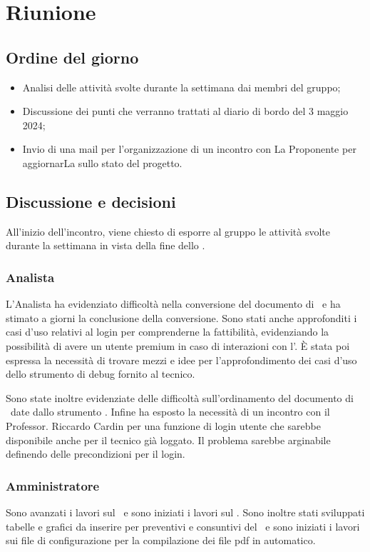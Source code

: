 \section{Riunione}
\subsection{Ordine del giorno}
\begin{itemize}
	\item Analisi delle attività svolte durante la settimana dai membri del gruppo;
	\item Discussione dei punti che verranno trattati al diario di bordo del 3 maggio 2024;
	\item Invio di una mail per l'organizzazione di un incontro con La Proponente per aggiornarLa sullo stato del progetto.
\end{itemize}

\subsection{Discussione e decisioni}
\par All'inizio dell'incontro, viene chiesto di esporre al gruppo le attività svolte durante la settimana in vista della fine dello .
\subsubsection{Analista}
\par L'Analista ha evidenziato difficoltà nella conversione del documento di \AdR\ e ha stimato a giorni la conclusione della conversione. Sono stati anche approfonditi i casi d'uso relativi al login per comprenderne la fattibilità, evidenziando la possibilità di avere un utente premium in caso di interazioni con l'. È stata poi espressa la necessità di trovare mezzi e idee per l'approfondimento dei casi d'uso dello strumento di debug fornito al tecnico.
\par Sono state inoltre evidenziate delle difficoltà sull'ordinamento del documento di \AdR\ date dallo strumento . Infine ha esposto la necessità di un incontro con il Professor. Riccardo Cardin per una funzione di login utente che sarebbe disponibile anche per il tecnico già loggato. Il problema sarebbe arginabile definendo delle precondizioni per il login. 
\subsubsection{Amministratore}
Sono avanzati i lavori sul \PdP\ e sono iniziati i lavori sul \PdQ. Sono inoltre stati sviluppati tabelle e grafici da inserire per preventivi e consuntivi del \PdP\ e sono iniziati i lavori sui file di configurazione per la compilazione dei file pdf in automatico.
